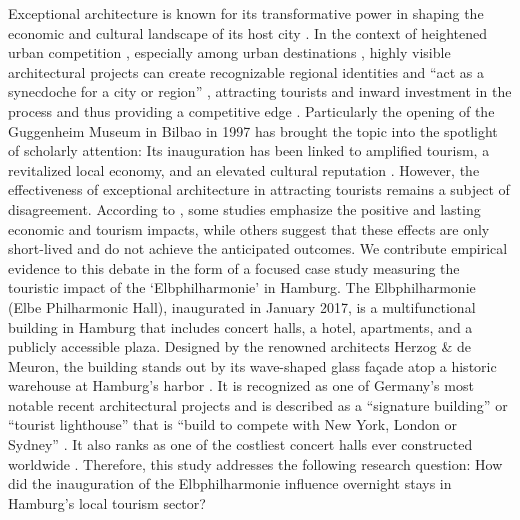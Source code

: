 \documentclass[a4paper, 12pt]{article}
\begin{document}
Exceptional architecture is known for its transformative power in shaping the economic and cultural landscape of its host city \citep{alaily-mattar2022a, alaily-mattar2018b, dreher2023, heidenreich2015}. In the context of heightened urban competition \citep{hausler2024, sklair2017, zenker2013}, especially among urban destinations \citep{defrantz2018}, highly visible architectural projects can create recognizable regional identities and ``act as a synecdoche for a city or region'' \citep[p.~1]{alaily-mattar2022a}, attracting tourists and inward investment in the process and thus providing a competitive edge \citep{balke2018, scerri2019}. Particularly the opening of the Guggenheim Museum in Bilbao in 1997 has brought the topic into the spotlight of scholarly attention: Its inauguration has been linked to amplified tourism, a revitalized local economy, and an elevated cultural reputation \citep{alaily-mattar2018b, plaza2006, plaza2009}. However, the effectiveness of exceptional architecture in attracting tourists remains a subject of disagreement. According to \citet[p.~442]{dreher2020}, some studies emphasize the positive and lasting economic and tourism impacts, while others suggest that these effects are only short-lived and do not achieve the anticipated outcomes. We contribute empirical evidence to this debate in the form of a focused case study measuring the touristic impact of the `Elbphilharmonie' in Hamburg. The Elbphilharmonie (Elbe Philharmonic Hall), inaugurated in January 2017, is a multifunctional building in Hamburg that includes concert halls, a hotel, apartments, and a publicly accessible plaza. Designed by the renowned architects Herzog \& de Meuron, the building stands out by its wave-shaped glass façade atop a historic warehouse at Hamburg's harbor \citep{dreher2020, hofmeister2021}. It is recognized as one of Germany's most notable recent architectural projects \citep[p.~108]{dreher2022} and is described as a ``signature building'' \citep[p.~90]{heuer2022} or ``tourist lighthouse'' \citep[p.~55]{just2022} that is ``build to compete with New York, London or Sydney'' \citep[p.~647]{zenker2013}. It also ranks as one of the costliest concert halls ever constructed worldwide \citep{heuer2022}. Therefore, this study addresses the following research question: How did the inauguration of the Elbphilharmonie influence overnight stays in Hamburg's local tourism sector?
\end{document}
